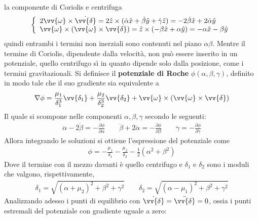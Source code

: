 \documentclass[a4paper, oneside]{book}
\begin{document}
la componente di Coriolis e centrifuga 
\begin{gather*}
    \left\{\begin{array}{l}
        2\vv{\omega} \times \dot{\vv{\delta} } = 2\hat{z} \times (\dot{\alpha} \hat{x} + \dot{\beta} \hat{y} + \dot{\gamma} \hat{z}      )   = -2\dot{\beta}\hat{x} + 2\dot{\alpha} \hat{y} \\
        \vv{\omega} \times (\vv{\omega} \times \vv{\delta}  ) = \hat{z} \times (-\beta \hat{x} + \alpha \hat{y}  ) = - \alpha \hat{x} - \beta \hat{y}        
    \end{array}\right.
\end{gather*}
quindi entrambi i termini non inerziali sono contenuti nel piano $\alpha\beta$. Mentre il termine 
di Coriolis, dipendente dalla velocità, non può essere inserito in un potenziale, quello 
centrifugo sì in quanto dipende solo dalla posizione, come i termini gravitazionali. 
Si definisce il \textbf{potenziale di Roche} $\phi(\alpha, \beta, \gamma)$, definito 
in modo tale che il suo gradiente sia equivalente a
\begin{gather*}
    \nabla \phi = \frac{\mu_1}{\delta_1^{3}}\vv{\delta_1} + \frac{\mu_2}{\delta_2^{3}}\vv{\delta_2} + \vv{\omega} \times (\vv{\omega} \times \vv{\delta}  )   
\end{gather*} 
Il quale si scompone nelle componenti $\alpha, \beta, \gamma$ secondo le seguenti:
\begin{align}
    \ddot{\alpha} - 2\dot{\beta} = - \frac{\partial \phi}{\partial \alpha}  \qquad \ddot{\beta} + 2\dot{\alpha} = -\frac{\partial \phi}{\partial \beta} \qquad \ddot{\gamma} = - \frac{\partial \phi}{\partial \gamma}
\end{align}
Allora integrando le soluzioni si ottiene l'espressione del potenziale come 
\begin{align}
        \phi = - \frac{\mu_1}{\delta_1} - \frac{\mu_2}{\delta_2} - \frac{1}{2}(\alpha^{2} + \beta^{2}) 
\end{align}
Dove il termine con il mezzo davanti è quello centrifugo e $\delta_1$ e $\delta_2$ sono i moduli che valgono, rispettivamente,
\begin{gather*}
    \delta_1 = \sqrt{(\alpha + \mu_2)^{2} + \beta^{2} + \gamma^{2}} \qquad \delta_2 = \sqrt{(\alpha - \mu_1)^{2} + \beta^{2} + \gamma^{2}}  
\end{gather*}
Analizzando adesso i punti di equilibrio con $\dot{\vv{\delta} } = \ddot{\vv{\delta} } = 0$, ossia i 
punti estremali del potenziale con gradiente uguale a zero:
\end{document}
